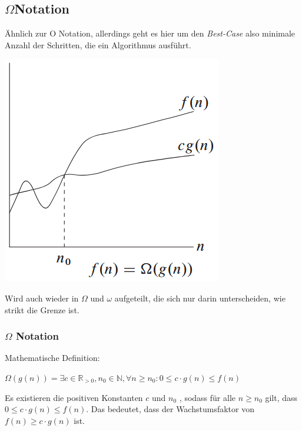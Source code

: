 \documentclass[
../../AuD-Zusammenfassung.tex,
]
{subfiles}
\begin{document}
\newpage
\subsection{$\Omega$\space Notation}
Ähnlich zur O Notation, allerdings geht es hier um den \textit{Best-Case} also minimale Anzahl der Schritten, die ein Algorithmus ausführt.
\begin{center}
    \includegraphics[scale=0.6]{Pics/OmegaNotation.png}
\end{center}
Wird auch wieder in $\Omega$ und $\omega$ aufgeteilt, die sich nur darin unterscheiden, wie strikt die Grenze ist.
\subsubsection{$\Omega$ Notation}
Mathematische Definition:
\begin{center}
    $\Omega(g(n)) = \exists c \in \mathbb{R}_{>0}, n_0 \in \mathbb{N}, \forall n \geq n_0:  0 \leq c \cdot g(n) \leq f(n)$
\end{center}
Es existieren die positiven Konstanten $c$ und $n_0$ , sodass für alle $n \geq n_0$ gilt, dass  $0 \leq c \cdot g(n) \leq f(n)$. 
Das bedeutet, dass der Wachstumsfaktor von $f(n) \geq c \cdot g(n)$ ist. \\
\end{document}
